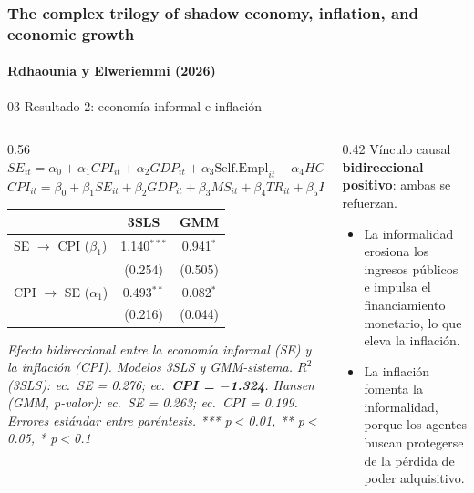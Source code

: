 \documentclass[serif, aspectratio=169]{beamer}
\newcommand{\paperframe}{%
  \frametitle{The complex trilogy of shadow economy, inflation, and economic growth}%
  \framesubtitle{Rdhaounia y Elweriemmi (2026)}}
\begin{document}
\begin{frame}
\paperframe
\begin{block}{03 \quad Resultado 2: economía informal e inflación}\end{block}
\begin{columns}[T]
\begin{column}{0.56\textwidth}
\centering
{\scriptsize
$SE_{it} = \alpha_0 + \alpha_1 CPI_{it} + \alpha_2 GDP_{it} + \alpha_3 \text{Self.Empl}_{it} + \alpha_4 HC_{it} + \lambda_{it}$\\[2pt]
$CPI_{it} = \beta_0 + \beta_1 SE_{it} + \beta_2 GDP_{it} + \beta_3 MS_{it} + \beta_4 TR_{it} + \beta_5 HC_{it} + \epsilon_{it}$}

\vspace{4pt}
{\scriptsize
\begin{tabular}{lcc}
\toprule
 & \textbf{3SLS} & \textbf{GMM} \\
\midrule
SE $\rightarrow$ CPI ($\beta_1$)  & 1.140$^{***}$ & 0.941$^{*}$ \\
                                  & (0.254) & (0.505) \\
CPI $\rightarrow$ SE ($\alpha_1$) & 0.493$^{**}$ & 0.082$^{*}$ \\
                                  & (0.216) & (0.044) \\
\bottomrule
\end{tabular}}

\vspace{2pt}
{\tiny\itshape Efecto bidireccional entre la economía informal (SE) y la inflación (CPI). Modelos 3SLS y GMM-sistema.
$R^2$ (3SLS): ec.\ SE = 0.276; ec.\ \textbf{CPI = $-$1.324}. Hansen (GMM, p-valor): ec.\ SE = 0.263; ec.\ CPI = 0.199.
Errores estándar entre paréntesis. *** p$<$0.01, ** p$<$0.05, * p$<$0.1}
\end{column}
\begin{column}{0.42\textwidth}
\small
Vínculo causal \textbf{bidireccional positivo}: ambas se refuerzan.
\begin{itemize}
  \item La informalidad erosiona los ingresos públicos e impulsa el financiamiento monetario, lo que eleva la inflación.
  \item La inflación fomenta la informalidad, porque los agentes buscan protegerse de la pérdida de poder adquisitivo.
\end{itemize}
\end{column}
\end{columns}
\end{frame}
\end{document}
